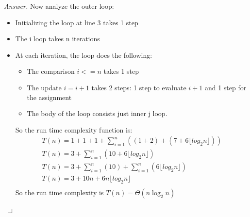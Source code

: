 \documentclass[11pt]{article}
\theoremstyle{definition}
\theoremstyle{definition}
\theoremstyle{definition}
\begin{document}
\begin{proof}[Answer]
Now analyze the outer loop:
\begin{itemize}
\item Initializing the loop at line 3 takes 1 step
\item The i loop takes n iterations 
\item At each iteration, the loop does the following:
	\begin{itemize}
	\item The comparison $i<=n$ takes 1 step
	\item The update $i=i+1$ takes 2 steps:  1 step to evaluate $i+1$ and 1 step for the assignment 
	\item The body of the loop consists just inner j loop. 
	\end{itemize}
So the run time complexity function is:
\begin{align*} 
T(n)= 1+1+1+ \sum_{i=1}^{ n} ((1+2) +(7 + 6\lfloor log_2 n \rfloor))  \\
T(n)= 3+ \sum_{i=1}^{ n} (10+ 6\lfloor log_2 n \rfloor) \\ 
T(n)= 3+ \sum_{i=1}^{ n} (10) + \sum_{i=1}^{ n} (6\lfloor log_2 n \rfloor) \\ 
T(n)= 3+ 10n + 6n\lfloor log_2 n \rfloor \\ 
\end{align*}
So the run time complexity is $T(n) = \Theta(n\log_2 n)$
\end{itemize}


\end{proof}



\end{document}
